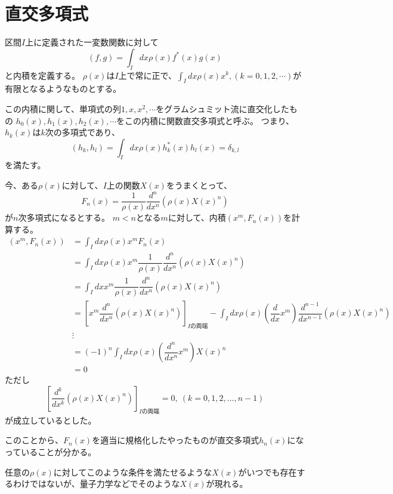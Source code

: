 \section{直交多項式}
区間$I$上に定義された一変数関数に対して
\begin{equation}
  (f,g) = \int_I dx \rho(x)f^*(x)g(x)
\end{equation}
と内積を定義する。
$\rho(x)$は$I$上で常に正で、$\int_I dx\rho(x)x^k,(k = 0,1,2,\cdots)$が有限となるようなものとする。

この内積に関して、単項式の列$1,x,x^2,\cdots$をグラムシュミット流に直交化したもの
$h_0(x), h_1(x), h_2(x), \cdots$をこの内積に関数直交多項式と呼ぶ。
つまり、$h_k(x)$は$k$次の多項式であり、
\begin{equation}
  (h_k,h_l) = \int_I dx\rho(x)h_k^*(x)h_l(x) = \delta_{k,l}
\end{equation}
を満たす。

今、ある$\rho(x)$に対して、$I$上の関数$X(x)$をうまくとって、
\begin{equation}
  \label{Fn}
  F_n(x) = \dfrac{1}{\rho(x)}\dfrac{d^n}{dx^n}(\rho(x)X(x)^n)
\end{equation}
が$n$次多項式になるとする。
$m < n$となる$m$に対して、内積$(x^m, F_n(x))$を計算する。
\begin{align}
  (x^m, F_n(x)) &= \int_I dx\rho(x)x^m F_n(x) \\
  &= \int_I dx\rho(x)x^m \dfrac{1}{\rho(x)}\dfrac{d^n}{dx^n}(\rho(x)X(x)^n) \\
  &= \int_I dx x^m \dfrac{1}{\rho(x)}\dfrac{d^n}{dx^n}(\rho(x)X(x)^n) \\
  &= \left[ x^m \dfrac{d^n}{dx^n}(\rho(x)X(x)^n) \right]_{Iの両端}
  - \int_I dx\rho(x)(\dfrac{d}{dx}x^m)\dfrac{d^{n-1}}{dx^{n-1}}(\rho(x)X(x)^n) \\
  &\vdots  \nonumber\\
  &= (-1)^n\int_I dx\rho(x)(\dfrac{d^n}{dx^n}x^m)X(x)^n \\
  &= 0
\end{align}
ただし
\begin{equation}
  \left[ \dfrac{d^k}{dx^k}(\rho(x)X(x)^n) \right]_{Iの両端} = 0, ~(k = 0,1,2,\ldots,n-1)
\end{equation}
が成立しているとした。

このことから、$F_n(x)$を適当に規格化したやったものが直交多項式$h_n(x)$になっていることが分かる。

任意の$\rho(x)$に対してこのような条件を満たせるような$X(x)$がいつでも存在するわけではないが、量子力学などでそのような$X(x)$が現れる。

